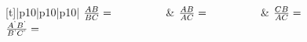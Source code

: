 {        \begin{center}
      \label{m39405*id78604}
    \noindent
      \tablelasttail{}
      \begin{xtabular*}{\mytablewidth}[t]{|p{10\mystarwidth}|p{10\mystarwidth}|p{10\mystarwidth}|}\hline
     \tabularnewline{}
                \begin{math}\frac{AB}{BC}=\phantom{\rule{42.67912pt}{0ex}}\end{math}
               &
                \begin{math}\frac{AB}{AC}=\phantom{\rule{42.67912pt}{0ex}}\end{math}
               &
                \begin{math}\frac{CB}{AC}=\phantom{\rule{42.67912pt}{0ex}}\end{math}
     \tabularnewline{}
                \begin{math}\frac{{A}^{\text{'}}{B}^{\text{'}}}{{B}^{\text{'}}{C}^{\text{'}}}=\phantom{\rule{42.67912pt}{0ex}}\end{math}

\end{xtabular*}
\end{center}}
